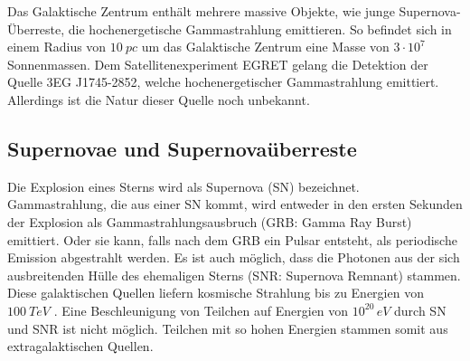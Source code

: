 Das Galaktische Zentrum enthält mehrere massive Objekte, wie junge Supernova-Überreste, die hochenergetische Gammastrahlung emittieren.
So befindet sich in einem Radius von $\SI{10}{pc}$ um das Galaktische Zentrum eine Masse von $3\cdot 10^7$ Sonnenmassen. 
Dem Satellitenexperiment EGRET gelang die Detektion der Quelle 3EG J1745-2852, welche hochenergetischer Gammastrahlung emittiert.
Allerdings ist die Natur dieser Quelle noch unbekannt.\cite{GalacticCenter}\cite{Weekes}





\subsection{Supernovae und Supernovaüberreste}
Die Explosion eines Sterns wird als Supernova (SN) bezeichnet.
Gammastrahlung, die aus einer SN kommt, wird entweder in den ersten Sekunden der Explosion als Gammastrahlungsausbruch (GRB: Gamma Ray Burst) emittiert.
Oder sie kann, falls nach dem GRB ein Pulsar entsteht, als periodische Emission abgestrahlt werden.
Es ist auch möglich, dass die Photonen aus der sich ausbreitenden Hülle des ehemaligen Sterns (SNR: Supernova Remnant) stammen. 
Diese galaktischen Quellen liefern kosmische Strahlung bis zu Energien von $\SI{100}{TeV}$ \cite{Weekes}.
Eine Beschleunigung von Teilchen auf Energien von $10^{20}\,\si{eV}$ durch SN und SNR ist nicht möglich.
Teilchen mit so hohen Energien stammen somit aus extragalaktischen Quellen.\cite{Weekes}



